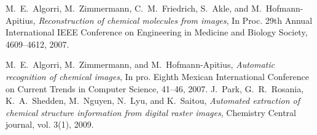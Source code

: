 \documentclass[oneside,a4paper,12pt]{book}
\begin{document}
\begin{thebibliography}{1}
 
 M.~E.~Algorri, M.~Zimmermann, C.~M.~Friedrich, S.~Akle, and M.~Hofmann-Apitius,
\emph{Reconstruction of chemical molecules from images},
In Proc. 29th Annual International IEEE Conference on Engineering in
Medicine and Biology Society, 4609--4612, 2007.

M.~E.~Algorri, M.~Zimmermann, and M.~Hofmann-Apitius,
\emph{Automatic recognition of chemical images},
In pro. Eighth Mexican International Conference on Current Trends in Computer Science, 41--46, 2007.
J.~Park, G.~R.~Rosania, K.~A.~Shedden, M.~Nguyen, N.~Lyu, and K.~Saitou,
\emph{Automated extraction of chemical structure information from digital raster images}, Chemistry Central journal, vol. 3(1), 2009.
\end{thebibliography}
\end{document}
